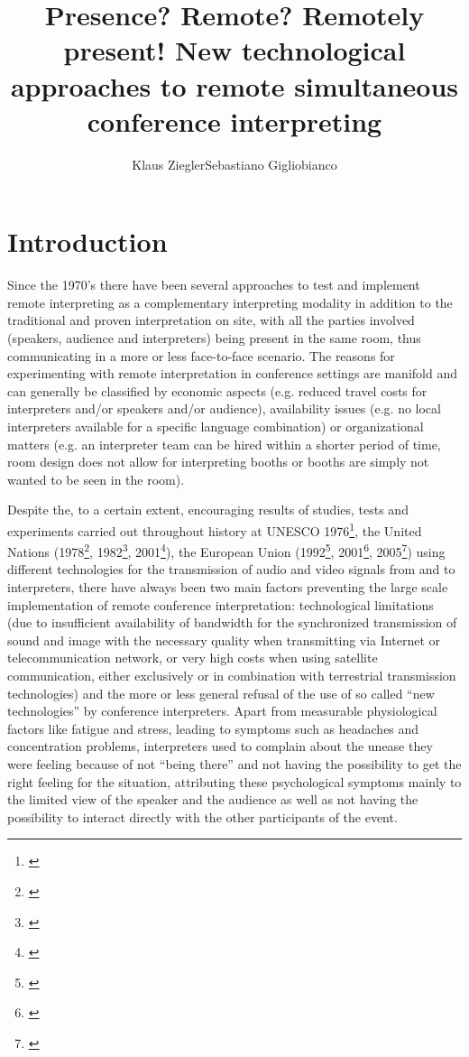 \documentclass[output=paper]{langsci/langscibook}
\author{Klaus Ziegler\affiliation{affiliation}\lastand Sebastiano Gigliobianco\affiliation{affiliation}}
\title{Presence? Remote? Remotely present! New technological approaches to remote simultaneous conference interpreting}
\begin{document}
\section{Introduction}
Since the 1970’s there have been several approaches to test and implement remote interpreting as a complementary interpreting modality in addition to the traditional and proven interpretation on site, with all the parties involved (speakers, audience and interpreters) being present in the same room, thus communicating in a more or less face-to-face scenario. The reasons for experimenting with remote interpretation in conference settings are manifold and can generally be classified by economic aspects (e.g. reduced travel costs for interpreters and/or speakers and/or audience), availability issues (e.g. no local interpreters available for a specific language combination) or organizational matters (e.g. an interpreter team can be hired within a shorter period of time, room design does not allow for interpreting booths or booths are simply not wanted to be seen in the room). 

Despite the, to a certain extent, encouraging results of studies, tests and experiments carried out throughout history at UNESCO 1976\footnote{\citealt{Kurz2000}}, the United Nations (1978\footnote{\citealt{Chernov2004}}, 1982\footnote{\citet{UNESCO1987}}, 2001\footnote{\citealt{Mouzourakis2006}}), the European Union (1992\footnote{\citealt{Kurz2000}}, 2001\footnote{\citealt{Europarl2001}}, 2005\footnote{\citealt{Roziner2010}}) using different technologies for the transmission of audio and video signals from and to interpreters, there have always been two main factors preventing the large scale implementation of remote conference interpretation: technological limitations (due to insufficient availability of bandwidth for the synchronized transmission of sound and image with the necessary quality when transmitting via Internet or telecommunication network, or very high costs when using satellite communication, either exclusively or in combination with terrestrial transmission technologies) and the more or less general refusal of the use of so called “new technologies” by conference interpreters. Apart from measurable physiological factors like fatigue and stress, leading to symptoms such as headaches and concentration problems, interpreters used to complain about the unease they were feeling because of not “being there” \citep{Mouzourakis2006} and not having the possibility to get the right feeling for the situation, attributing these psychological symptoms mainly to the limited view of the speaker and the audience as well as not having the possibility to interact directly with the other participants of the event.
\end{document}
